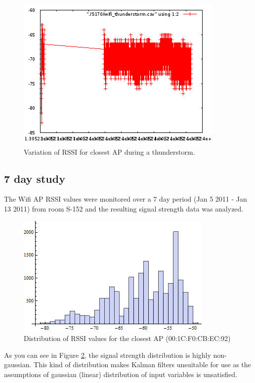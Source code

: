 \begin{figure}\centering
    \includegraphics{figures/wifi_thunderstorm.png}
    \caption{Variation of RSSI for closest AP during a thunderstorm. \label{fig:closestAPthunderstorm}}
\end{figure}

\subsection{7 day study}

The Wifi AP RSSI values were monitored over a 7 day period (Jan 5 2011 - Jan 13 2011) from room S-152
and the resulting signal strength data was analyzed.

\begin{figure}\centering
    \includegraphics{figures/histogram_00_1C_F0_CB_EC_92.png}
    \caption{Distribution of RSSI values for the closest AP (00:1C:F0:CB:EC:92) \label{fig:histogram_00_1C_F0_CB_EC_92}}
\end{figure}

As you can see in Figure \ref{fig:histogram_00_1C_F0_CB_EC_92}, the signal strength
distribution is highly non-gaussian. This kind of distribution makes Kalman filters
unsuitable for use as the assumptions of gaussian (linear) distribution of 
input variables is unsatisfied.


